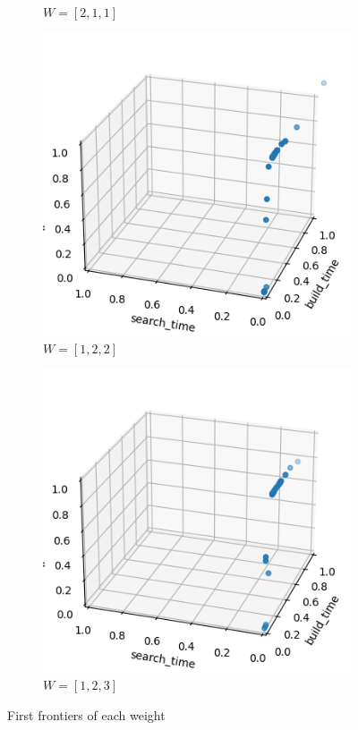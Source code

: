 \begin{figure}[ht]
\begin{subfigure}{0.24\textwidth}
        \caption{\(W = [2, 1, 1]\)}
    \end{subfigure}
    \hfill
    \begin{subfigure}{0.24\textwidth}
        \includegraphics[width=\textwidth]{../images/report/bo-frontier122.png}
        \caption{\(W = [1, 2, 2]\)}
    \end{subfigure}
    \hfill
    \begin{subfigure}{0.24\textwidth}
        \includegraphics[width=\textwidth]{../images/report/bo-frontier123.png}
        \caption{\(W = [1, 2, 3]\)}
    \end{subfigure}
    \hfill
    \caption{First frontiers of each weight}
    \label{fig:bo-first-frontiers}
\end{figure}

